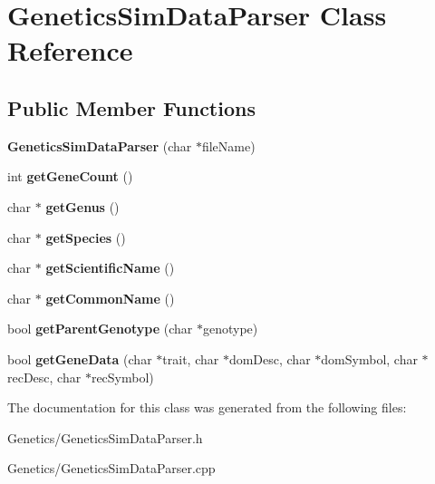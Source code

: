\hypertarget{class_genetics_sim_data_parser}{}\section{Genetics\+Sim\+Data\+Parser Class Reference}
\label{class_genetics_sim_data_parser}
\subsection*{Public Member Functions}
\begin{DoxyCompactItemize}
\item 
\hypertarget{class_genetics_sim_data_parser_a1115728ef64adaca0882855775a03fde}{}{\bfseries Genetics\+Sim\+Data\+Parser} (char $\ast$file\+Name)\label{class_genetics_sim_data_parser_a1115728ef64adaca0882855775a03fde}

\item 
\hypertarget{class_genetics_sim_data_parser_af5d625aef87b4e893d755ef8ba284a89}{}int {\bfseries get\+Gene\+Count} ()\label{class_genetics_sim_data_parser_af5d625aef87b4e893d755ef8ba284a89}

\item 
\hypertarget{class_genetics_sim_data_parser_a50adc731a54bda327aa49d5e173abbe3}{}char $\ast$ {\bfseries get\+Genus} ()\label{class_genetics_sim_data_parser_a50adc731a54bda327aa49d5e173abbe3}

\item 
\hypertarget{class_genetics_sim_data_parser_ac13e07486db1c65aed87a0b6249c4e51}{}char $\ast$ {\bfseries get\+Species} ()\label{class_genetics_sim_data_parser_ac13e07486db1c65aed87a0b6249c4e51}

\item 
\hypertarget{class_genetics_sim_data_parser_a1541715a692c012f0f3fbe8a997ff3fd}{}char $\ast$ {\bfseries get\+Scientific\+Name} ()\label{class_genetics_sim_data_parser_a1541715a692c012f0f3fbe8a997ff3fd}

\item 
\hypertarget{class_genetics_sim_data_parser_a23a7f0ae3ce3230962800d8cb81bdd61}{}char $\ast$ {\bfseries get\+Common\+Name} ()\label{class_genetics_sim_data_parser_a23a7f0ae3ce3230962800d8cb81bdd61}

\item 
\hypertarget{class_genetics_sim_data_parser_a68e7b81cf5b921c3483e6aa0bad461ec}{}bool {\bfseries get\+Parent\+Genotype} (char $\ast$genotype)\label{class_genetics_sim_data_parser_a68e7b81cf5b921c3483e6aa0bad461ec}

\item 
\hypertarget{class_genetics_sim_data_parser_a6b20d5399593182ea3cedf189c67bc5a}{}bool {\bfseries get\+Gene\+Data} (char $\ast$trait, char $\ast$dom\+Desc, char $\ast$dom\+Symbol, char $\ast$rec\+Desc, char $\ast$rec\+Symbol)\label{class_genetics_sim_data_parser_a6b20d5399593182ea3cedf189c67bc5a}

\end{DoxyCompactItemize}


The documentation for this class was generated from the following files\+:\begin{DoxyCompactItemize}
\item 
Genetics/Genetics\+Sim\+Data\+Parser.\+h\item 
Genetics/Genetics\+Sim\+Data\+Parser.\+cpp\end{DoxyCompactItemize}

